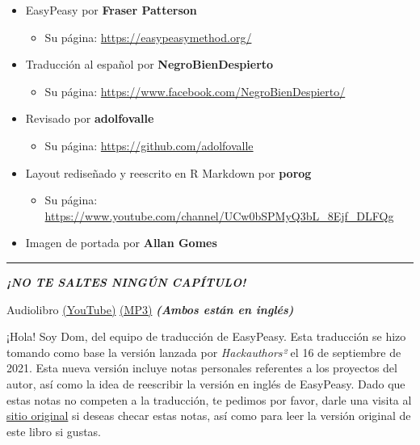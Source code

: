 \documentclass[
  openany]{book}
\providecommand{\tightlist}{%
  \setlength{\itemsep}{0pt}\setlength{\parskip}{0pt}}
\let\oldurl\url
\renewcommand\url{\renewcommand\UrlFont{\ttfamily\color{blue}}\oldurl}
\let\oldhref\href
\renewcommand{\href}[2]{\textcolor{blue}{\oldhref{#1}{#2}}}
\begin{document}
\begin{itemize}
\tightlist
\item
  EasyPeasy por \textbf{Fraser Patterson}

  \begin{itemize}
  \tightlist
  \item
    Su página: \url{https://easypeasymethod.org/}
  \end{itemize}
\item
  Traducción al español por \textbf{NegroBienDespierto}

  \begin{itemize}
  \tightlist
  \item
    Su página: \url{https://www.facebook.com/NegroBienDespierto/}
  \end{itemize}
\item
  Revisado por \textbf{adolfovalle}

  \begin{itemize}
  \tightlist
  \item
    Su página: \url{https://github.com/adolfovalle}
  \end{itemize}
\item
  Layout rediseñado y reescrito en R Markdown por \textbf{porog}

  \begin{itemize}
  \tightlist
  \item
    Su página: \url{https://www.youtube.com/channel/UCw0bSPMyQ3bL_8Ejf_DLFQg}
  \end{itemize}
\item
  Imagen de portada por \textbf{Allan Gomes}
\end{itemize}

\begin{center}\rule{0.5\linewidth}{0.5pt}\end{center}

{\emph{\textbf{¡NO TE SALTES NINGÚN CAPÍTULO!}}}

Audiolibro \href{https://www.youtube.com/watch?v=ZktxO6adTnI}{(YouTube)} \href{https://onedrive.live.com/?authkey=\%21AKIwfnK6Sjchng8\&cid=3961F5C89581C375\&id=3961F5C89581C375\%21256774\&parId=3961F5C89581C375\%21256773\&o=OneUp\&sw=bypassConfig}{(MP3)} \emph{\textbf{(Ambos están en inglés)}}

¡Hola! Soy Dom, del equipo de traducción de EasyPeasy. Esta traducción se hizo tomando como base la versión lanzada por \emph{Hackauthors²} el 16 de septiembre de 2021. Esta nueva versión incluye notas personales referentes a los proyectos del autor, así como la idea de reescribir la versión en inglés de EasyPeasy. Dado que estas notas no competen a la traducción, te pedimos por favor, darle una visita al \href{https://easypeasymethod.org/}{sitio original} si deseas checar estas notas, así como para leer la versión original de este libro si gustas.
\end{document}
